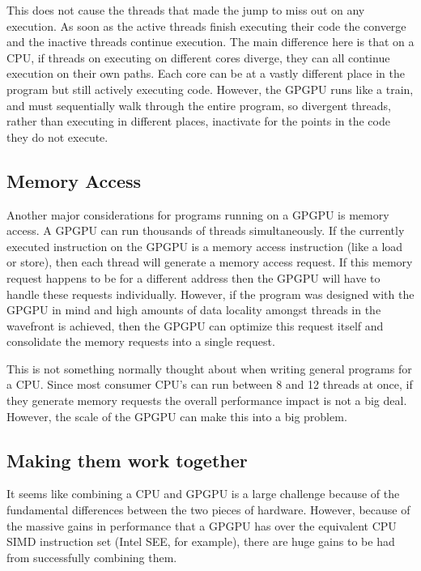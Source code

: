 This does not cause the threads that made the jump to miss out on any execution. As soon as the active threads finish executing their code the converge and the inactive threads continue execution. The main difference here is that on a CPU, if threads on executing on different cores diverge, they can all continue execution on their own paths. Each core can be at a vastly different place in the program but still actively executing code. However, the GPGPU runs like a train, and must sequentially walk through the entire program, so divergent threads, rather than executing in different places, inactivate for the points in the code they do not execute. \cite{memcached}

\subsection*{Memory Access}

Another major considerations for programs running on a GPGPU is memory access. A GPGPU can run thousands of threads simultaneously. If the currently executed instruction on the GPGPU is a memory access instruction (like a load or store), then each thread will generate a memory access request. If this memory request happens to be for a different address then the GPGPU will have to handle these requests individually. However, if the program was designed with the GPGPU in mind and high amounts of data locality amongst threads in the wavefront is achieved, then the GPGPU can optimize this request itself and consolidate the memory requests into a single request.

This is not something normally thought about when writing general programs for a CPU. Since most consumer CPU's can run between 8 and 12 threads at once, if they generate memory requests the overall performance impact is not a big deal. However, the scale of the GPGPU can make this into a big problem. \cite{memcached}



\subsection*{Making them work together}

It seems like combining a CPU and GPGPU is a large challenge because of the fundamental differences between the two pieces of hardware. However, because of the massive gains in performance that a GPGPU has over the equivalent CPU SIMD instruction set (Intel SEE, for example), there are huge gains to be had from successfully combining them. 














